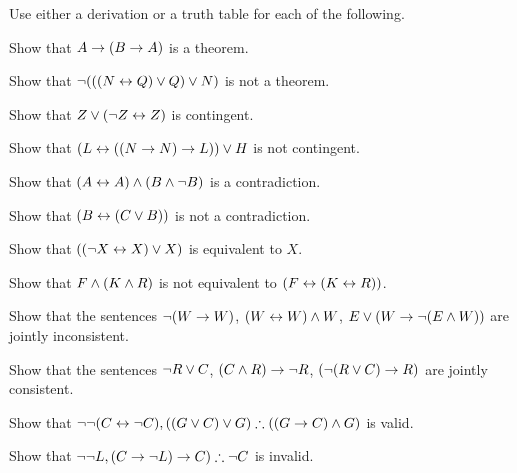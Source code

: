 \noindent\problempart Use either a derivation or a truth table for each of the following.
\begin{compactlist}%
\item Show that $A \rightarrow (B \rightarrow A)$ is a theorem.
\item Show that $\neg (((N \leftrightarrow Q) \vee Q) \vee N)$ is not a theorem.
\item Show that $ Z \vee (\neg Z \leftrightarrow Z) $ is contingent.
\item Show that $ (L \leftrightarrow ((N \rightarrow N) \rightarrow L)) \vee H $ is not contingent.
\item Show that $ (A \leftrightarrow A) \wedge (B \wedge \neg B)$ is a contradiction.
\item Show that $ (B \leftrightarrow (C \vee B)) $ is not a contradiction.
\item Show that $ ((\neg X \leftrightarrow X) \vee X) $ is equivalent to $X$.
\item Show that $F \wedge (K \wedge R) $ is not equivalent to $ (F \leftrightarrow (K \leftrightarrow R)) $.
\item Show that the sentences $ \neg (W \rightarrow W)$, $(W \leftrightarrow W) \wedge W$, $E \vee (W \rightarrow \neg (E \wedge W))$ are jointly inconsistent.
\item Show that the sentences  $\neg R \vee C $, $(C \wedge R) \rightarrow \neg R$, $(\neg (R \vee C) \rightarrow R) $ are jointly consistent.
\item Show that $\enot \enot (C \eiff \enot C), ((G \eor C) \eor G) \therefore ((G \eif C) \eand G) $ is valid.
\item Show that $ \enot \enot L,  (C \eif \enot L) \eif C) \therefore \enot C$ is invalid.
\end{compactlist}

